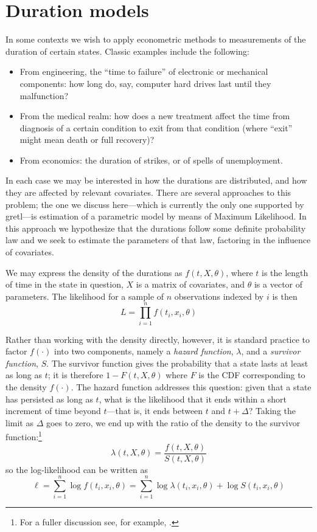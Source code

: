 \section{Duration models}
\label{sec:duration}

In some contexts we wish to apply econometric methods to measurements
of the duration of certain states. Classic examples include the
following:
\begin{itemize}
\item From engineering, the ``time to failure'' of electronic or
  mechanical components: how long do, say, computer hard drives
  last until they malfunction?
\item From the medical realm: how does a new treatment affect the
  time from diagnosis of a certain condition to exit from that
  condition (where ``exit'' might mean death or full recovery)?
\item From economics: the duration of strikes, or of spells of
  unemployment.
\end{itemize}

In each case we may be interested in how the durations are
distributed, and how they are affected by relevant covariates.  There
are several approaches to this problem; the one we discuss
here---which is currently the only one supported by gretl---is
estimation of a parametric model by means of Maximum Likelihood.  In
this approach we hypothesize that the durations follow some definite
probability law and we seek to estimate the parameters of that law,
factoring in the influence of covariates.

We may express the density of the durations as $f(t, X, \theta)$,
where $t$ is the length of time in the state in question, $X$ is a
matrix of covariates, and $\theta$ is a vector of parameters.  The
likelihood for a sample of $n$ observations indexed by $i$ is then
\[
L = \prod_{i=1}^n f(t_i, x_i, \theta)
\]

Rather than working with the density directly, however, it is standard
practice to factor $f(\cdot)$ into two components, namely a
\emph{hazard function}, $\lambda$, and a \emph{survivor function},
$S$.  The survivor function gives the probability that a state lasts
at least as long as $t$; it is therefore $1 - F(t, X, \theta)$ where
$F$ is the CDF corresponding to the density $f(\cdot)$. The hazard
function addresses this question: given that a state has persisted as
long as $t$, what is the likelihood that it ends within a short
increment of time beyond $t$---that is, it ends between $t$ and $t +
\Delta$?  Taking the limit as $\Delta$ goes to zero, we end up with
the ratio of the density to the survivor function:\footnote{For a
  fuller discussion see, for example, \cite{davidson-mackinnon04}.}
\begin{equation}
\label{eq:surv-decomp}
\lambda(t, X, \theta) = \frac{f(t, X, \theta)}{S(t, X, \theta)}
\end{equation}
so the log-likelihood can be written as
\begin{equation}
\label{eq:surv-loglik}
\ell = \sum_{i=1}^n \log f(t_i, x_i, \theta) = 
\sum_{i=1}^n \log \lambda(t_i, x_i, \theta) + 
\log S(t_i, x_i, \theta)
\end{equation}

